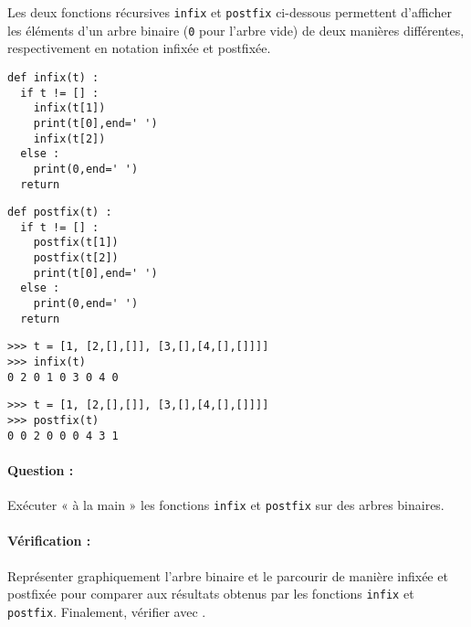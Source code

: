 Les deux fonctions récursives \texttt{infix} et \texttt{postfix} ci-dessous permettent
d'afficher les éléments d'un arbre binaire (\texttt{0} pour l'arbre vide) de deux
manières différentes, respectivement en notation infixée et postfixée.

\noindent
\begin{minipage}[t]{7cm}
\begin{lstlisting}
def infix(t) :
  if t != [] :
    infix(t[1])
    print(t[0],end=' ')
    infix(t[2])
  else : 
    print(0,end=' ')
  return
\end{lstlisting}
\end{minipage}
\hfill
\begin{minipage}[t]{7cm}
\begin{lstlisting}
def postfix(t) :
  if t != [] :
    postfix(t[1])
    postfix(t[2])
    print(t[0],end=' ')
  else : 
    print(0,end=' ')
  return
\end{lstlisting}
\end{minipage}
\vspace*{2mm}

\noindent
\begin{minipage}[t]{7cm}\footnotesize
\begin{Verbatim}
>>> t = [1, [2,[],[]], [3,[],[4,[],[]]]]
>>> infix(t)
0 2 0 1 0 3 0 4 0 
\end{Verbatim}
\end{minipage}
\hfill
\begin{minipage}[t]{7cm}\footnotesize
\begin{Verbatim}
>>> t = [1, [2,[],[]], [3,[],[4,[],[]]]]
>>> postfix(t)
0 0 2 0 0 0 4 3 1
\end{Verbatim}
\end{minipage}

\paragraph{Question :} Exécuter « à la main » les fonctions \texttt{infix} et \texttt{postfix} sur des arbres
binaires.

\paragraph{Vérification :} Représenter graphiquement l'arbre binaire et le parcourir
de manière infixée et postfixée pour comparer aux résultats obtenus par les fonctions
\texttt{infix} et \texttt{postfix}. Finalement, vérifier avec \python.

